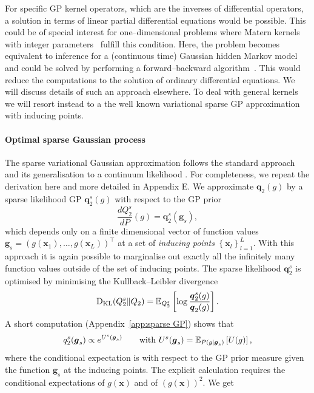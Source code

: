 \documentclass[twoside,11pt]{article}
\newcommand{\EE}[2]{\mathbb{E}_{#1}\left[ #2 \right]}
\newcommand{\set}[1]{\left\lbrace #1 \right\rbrace}
\newcommand{\bs}[1]{\boldsymbol{#1}}
\newcommand{\bx}{\boldsymbol{x}}
\newcommand{\bg}{\boldsymbol{g}}
\begin{document}
For specific GP kernel operators, which are the inverses of differential operators, a solution in terms of 
linear partial differential equations would be possible. This could be of special interest for 
one--dimensional problems where Matern kernels with integer parameters~\citep{rasmussen2006gaussian}
fulfill this condition. Here, the problem becomes equivalent to inference for  a (continuous time) Gaussian hidden Markov model and could be solved by performing a forward--backward algorithm~\citep{solin2016stochastic}. This would reduce the computations to the solution of ordinary differential equations. We will discuss details of such an approach elsewhere. To deal with general kernels we will resort instead to a 
the well known variational sparse GP approximation with inducing points.
\paragraph{Optimal sparse Gaussian process}
The sparse variational Gaussian approximation follows the standard approach~\citep{csato2002sparse,csato2002phd,titsias2009variational} and its generalisation to a continuum likelihood \citep{batz2018approximate,matthews2016sparse}. For completeness, we repeat the
derivation here and more detailed in Appendix E. We approximate $\bs{q}_2(g)$ by a sparse 
likelihood GP $\bs{q}_2^s(g)$ with respect to the GP prior
\begin{equation}\label{eq:sparse GP model}
\frac{dQ_2^s}{dP}(g) = \bs{q}_2^s(\bg_s),
\end{equation}
which depends only on a finite dimensional vector
of function values $\bs{g}_s = (g(\bx_1),\ldots,g(\bx_L))^\top$ at a set of {\it inducing points} $\set{\bx_l}_{l=1}^L$. With this approach it is again possible to marginalise out exactly all the infinitely many function values outside of the set of inducing points. 
The sparse likelihood $\bs{q}_2^s$ is optimised by minimising the Kullback--Leibler divergence
\begin{equation}
{\rm D}_{\rm KL}(Q_2^s\Vert Q_2) = \EE{Q_2^s}{\log\frac{\bs{q}_2^s(g)}{\bs{q}_2(g)}}.
\end{equation}
A short computation (Appendix~\ref{app:sparse GP}) shows that 
\begin{equation}
q_2^s(\bg_s) \propto e^{U^s(\bg_s)}\qquad {\rm with}\ U^s(\bs{g}_s) = \EE{P(g\vert\bg_s)}{U(g)}, 
\end{equation}
where the conditional expectation is with respect to the GP prior measure given the function $\bg_s$ at the inducing points. The explicit calculation requires the conditional expectations of $g(\bx)$ and of $(g(\bx))^2$. We get
\end{document}
